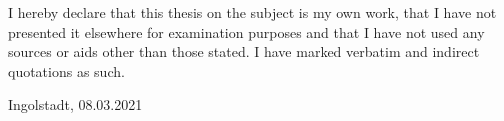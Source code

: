 
I hereby declare that this thesis on the subject is my own work, that I have not presented it elsewhere for examination purposes and that I have not used any sources or aids other than those stated. I have marked verbatim and indirect quotations as such.
\vspace{3cm}

Ingolstadt, 08.03.2021
